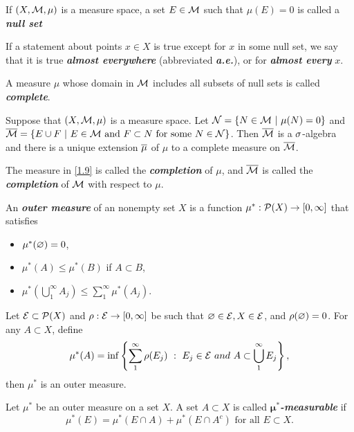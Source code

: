 \vs 

\dfn If $(X, \mathcal{M}, \mu)$ is a measure space, a set $E\in \mathcal{M}$ such that $\mu(E) = 0$ is called a \textbf{\textit{null set}}

\dfn If a statement about points $x\in X$ is true except for $x$ in some null set, we say that it is true \textbf{\textit{almost everywhere}} (abbreviated \textbf{\textit{a.e.}}), or for \textbf{\textit{almost every}} $x$.

\dfn A measure $\mu$ whose domain in $\mathcal{M}$ includes all subsets of null sets is called \textbf{\textit{complete}}.

\vs 

\begin{thm}\label{1.9}
Suppose that $(X, \mathcal{M}, \mu)$ is a measure space. Let $\mathcal{N} = \{N\in \mathcal{M}\ |\ \mu(N) = 0\}$ and $\overline{\mathcal{M}} = \{E\cup F\ |\ E\in \mathcal{M}\text{ and } F\subset N\text{ for some } N\in \mathcal{N}\}$. Then $\overline{\mathcal{M}}$ is a $\sigma$-algebra and there is a unique extension $\overline\mu$ of $\mu$ to a complete measure on $\overline{\mathcal{M}}$.
\end{thm}

\vs 

\dfn The measure in \autoref{1.9} is called the \textbf{\textit{completion}} of $\mu$, and $\overline{\mathcal{M}}$ is called the \textbf{\textit{completion}} of $\mathcal{M}$ with respect to $\mu$.

\dfn An \textit{\textbf{outer measure}} of an nonempty set $X$ is a function $\mu^*:\mathcal{P}(X)\rightarrow [0,\infty]$ that satisfies
\begin{itemize}
\item $\mu^*(\varnothing) = 0$,
\item $\mu^*(A)\leq \mu^*(B)$ if $A\subset B$,
\item $\mu^*(\bigcup_1^\infty A_j) \leq \sum_1^\infty \mu^*(A_j)$.
\end{itemize}

\vs 

\begin{prop}
Let $\mathcal{E}\subset \mathcal{P}(X)$ and $\rho:\mathcal{E}\rightarrow [0,\infty]$ be such that $\varnothing\in \mathcal{E}, X\in \mathcal{E}$, and $\rho(\varnothing) = 0$. For any $A\subset X$, define
\[\mu^*(A) = \inf\left\{\sum_1^\infty \rho(E_j)\ :\ E_j\in \mathcal{E}\ and\ A\subset\bigcup_1^\infty E_j\right\},\]
then $\mu^*$ is an outer measure.
\end{prop}

\vs 

\dfn Let $\mu^*$ be an outer measure on a set $X$. A set $A\subset X$ is called \textbf{\textit{$\boldsymbol{\mu^*}$-measurable}} if 
\[\mu^*(E) = \mu^*(E\cap A) + \mu^*(E\cap A^c)\text{ for all $E\subset X$}.\]


